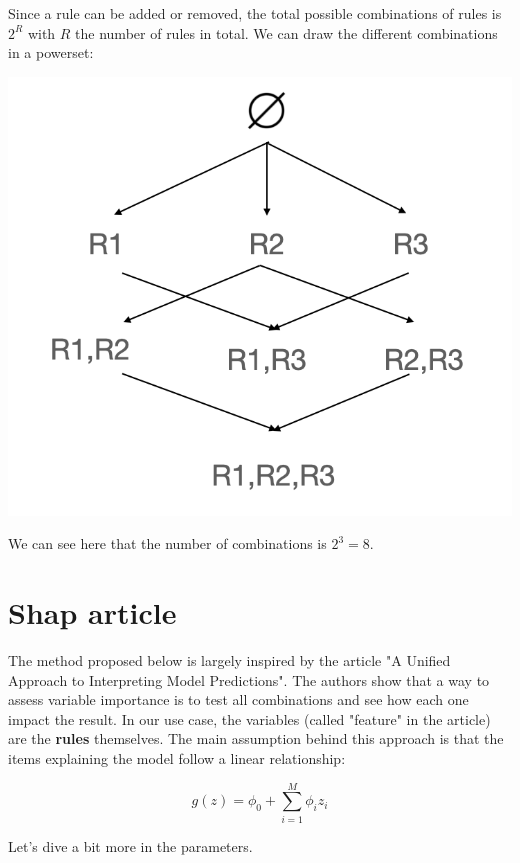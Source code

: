 Since a rule can be added or removed, the total possible combinations of rules is $2^R$ with $R$ the number of rules in total. We can draw the different combinations in a powerset:

\begin{center}
\includegraphics[scale=0.6]{powerset.png}
\end{center}

We can see here that the number of combinations is $2^3 = 8$. \\

\section{Shap article}

\label{sec:shap-article}

The method proposed below is largely inspired by the article "A Unified Approach to Interpreting Model Predictions". The authors show that a way to assess variable importance is to test all combinations and see how each one impact the result. In our use case, the variables (called "feature" in the article) are the \textbf{rules} themselves. The main assumption behind this approach is that the items explaining the model follow a linear relationship:

$$g(z) = \phi_0 + \sum_{i=1}^M \phi_i z_i$$

Let's dive a bit more in the parameters. \\

